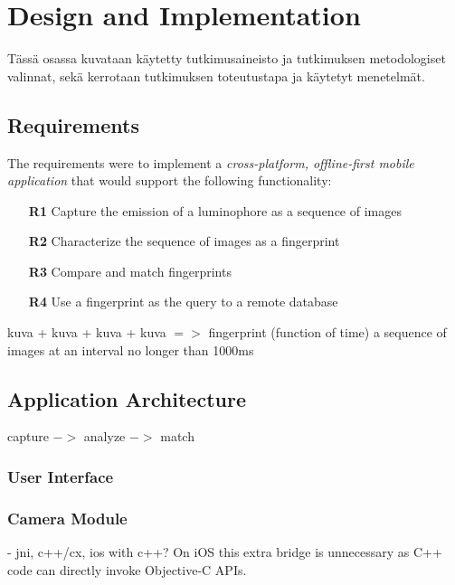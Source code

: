 \documentclass[thesis.tex]{subfiles}
\begin{document}
\chapter{Design and Implementation}
\label{chapter:design-implementation}

Tässä osassa kuvataan käytetty tutkimusaineisto ja tutkimuksen metodologiset valinnat, sekä kerrotaan tutkimuksen toteutustapa ja käytetyt menetelmät.


\section{Requirements}


\noindent The requirements were to implement a \emph{cross-platform, offline-first mobile application} that would support the following functionality:

\begin{itemize}
    \item [\textbf{R1}] Capture the emission of a luminophore as a sequence of images
    \item [\textbf{R2}] Characterize the sequence of images as a fingerprint
    \item [\textbf{R3}] Compare and match fingerprints
    \item [\textbf{R4}] Use a fingerprint as the query to a remote database
\end{itemize}
 kuva + kuva + kuva + kuva $=>$ fingerprint
(function of time)
a sequence of images at an interval no longer than 1000ms

\section{Application Architecture}

capture $->$ analyze $->$ match

\subsection{User Interface}

\subsection{Camera Module}
- jni, c++/cx, ios with c++?
 On iOS this extra bridge is unnecessary as C++ code can directly invoke Objective-C APIs.
\end{document}
